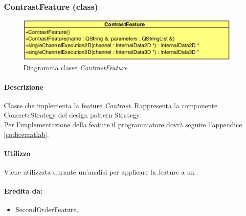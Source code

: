 \begin{itemize}
	\end{itemize}

\color{black}
\pagebreak
\subsubsection{ContrastFeature (class)}
\label{ConstrastFeature}
\begin{figure}[!h]
\centering
			\includegraphics[scale=1]{./Content/Immagini/modelCore/ContrastFeature.png}
			\caption{Diagramma classe \textsl{ContrastFeature}}
			\label{contrastFeature_img}
\end{figure}

\paragraph{Descrizione \\} Classe che implementa la feature\g{} \textit{Contrast}. Rappresenta la componente ConcreteStrategy del design pattern\g{} Strategy.
\\Per l'implementazione della feature\g{} il programmatore dovrà seguire l'appendice \ref{codicematlab}.

\paragraph{Utilizzo\\} Viene utilizzata durante un'analisi per applicare la feature\g{} a un \dataset{}.

\paragraph{Eredita da:}
\begin{itemize}
	\item SecondOrderFeature.
\end{itemize}



